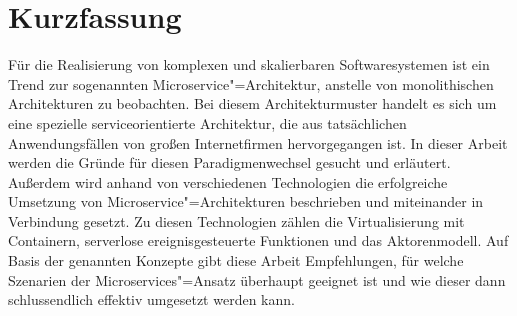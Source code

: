 \chapter{Kurzfassung}

Für die Realisierung von komplexen und skalierbaren Softwaresystemen ist ein Trend zur sogenannten Microservice"=Architektur, anstelle von monolithischen Architekturen zu beobachten. Bei diesem Architekturmuster handelt es sich um eine spezielle serviceorientierte Architektur, die aus tatsächlichen Anwendungsfällen von großen Internetfirmen hervorgegangen ist. In dieser Arbeit werden die Gründe für diesen Paradigmenwechsel gesucht und erläutert. Außerdem wird anhand von verschiedenen Technologien die erfolgreiche Umsetzung von Microservice"=Architekturen beschrieben und miteinander in Verbindung gesetzt. Zu diesen Technologien zählen die Virtualisierung mit Containern, serverlose ereignisgesteuerte Funktionen und das Aktorenmodell. Auf Basis der genannten Konzepte gibt diese Arbeit Empfehlungen, für welche Szenarien der Microservices"=Ansatz überhaupt geeignet ist und wie dieser dann schlussendlich effektiv umgesetzt werden kann.